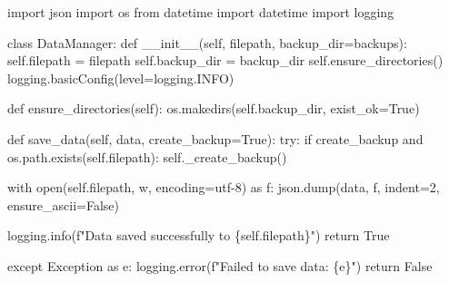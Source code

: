 \documentclass[
  letterpaper,
  DIV=11,
  numbers=noendperiod,
  oneside]{scrreprt}
\newenvironment{Shaded}{}{}
\newcommand{\BuiltInTok}[1]{\textcolor[rgb]{0.84,0.23,0.29}{#1}}
\newcommand{\ControlFlowTok}[1]{\textcolor[rgb]{0.84,0.23,0.29}{#1}}
\newcommand{\DecValTok}[1]{\textcolor[rgb]{0.00,0.36,0.77}{#1}}
\newcommand{\FunctionTok}[1]{\textcolor[rgb]{0.44,0.26,0.76}{#1}}
\newcommand{\ImportTok}[1]{\textcolor[rgb]{0.01,0.18,0.38}{#1}}
\newcommand{\KeywordTok}[1]{\textcolor[rgb]{0.84,0.23,0.29}{#1}}
\newcommand{\NormalTok}[1]{\textcolor[rgb]{0.14,0.16,0.18}{#1}}
\newcommand{\OperatorTok}[1]{\textcolor[rgb]{0.14,0.16,0.18}{#1}}
\newcommand{\PreprocessorTok}[1]{\textcolor[rgb]{0.84,0.23,0.29}{#1}}
\newcommand{\SpecialCharTok}[1]{\textcolor[rgb]{0.00,0.36,0.77}{#1}}
\newcommand{\SpecialStringTok}[1]{\textcolor[rgb]{0.01,0.18,0.38}{#1}}
\newcommand{\StringTok}[1]{\textcolor[rgb]{0.01,0.18,0.38}{#1}}
\newcommand{\VariableTok}[1]{\textcolor[rgb]{0.89,0.38,0.04}{#1}}
\begin{document}
\begin{Shaded}
\begin{Highlighting}[]
\ImportTok{import}\NormalTok{ json}
\ImportTok{import}\NormalTok{ os}
\ImportTok{from}\NormalTok{ datetime }\ImportTok{import}\NormalTok{ datetime}
\ImportTok{import}\NormalTok{ logging}

\KeywordTok{class}\NormalTok{ DataManager:}
    \KeywordTok{def} \FunctionTok{\_\_init\_\_}\NormalTok{(}\VariableTok{self}\NormalTok{, filepath, backup\_dir}\OperatorTok{=}\StringTok{\textquotesingle{}backups\textquotesingle{}}\NormalTok{):}
        \VariableTok{self}\NormalTok{.filepath }\OperatorTok{=}\NormalTok{ filepath}
        \VariableTok{self}\NormalTok{.backup\_dir }\OperatorTok{=}\NormalTok{ backup\_dir}
        \VariableTok{self}\NormalTok{.ensure\_directories()}
\NormalTok{        logging.basicConfig(level}\OperatorTok{=}\NormalTok{logging.INFO)}
        
    \KeywordTok{def}\NormalTok{ ensure\_directories(}\VariableTok{self}\NormalTok{):}
\NormalTok{        os.makedirs(}\VariableTok{self}\NormalTok{.backup\_dir, exist\_ok}\OperatorTok{=}\VariableTok{True}\NormalTok{)}
        
    \KeywordTok{def}\NormalTok{ save\_data(}\VariableTok{self}\NormalTok{, data, create\_backup}\OperatorTok{=}\VariableTok{True}\NormalTok{):}
        \ControlFlowTok{try}\NormalTok{:}
            \ControlFlowTok{if}\NormalTok{ create\_backup }\KeywordTok{and}\NormalTok{ os.path.exists(}\VariableTok{self}\NormalTok{.filepath):}
                \VariableTok{self}\NormalTok{.\_create\_backup()}
                
            \ControlFlowTok{with} \BuiltInTok{open}\NormalTok{(}\VariableTok{self}\NormalTok{.filepath, }\StringTok{\textquotesingle{}w\textquotesingle{}}\NormalTok{, encoding}\OperatorTok{=}\StringTok{\textquotesingle{}utf{-}8\textquotesingle{}}\NormalTok{) }\ImportTok{as}\NormalTok{ f:}
\NormalTok{                json.dump(data, f, indent}\OperatorTok{=}\DecValTok{2}\NormalTok{, ensure\_ascii}\OperatorTok{=}\VariableTok{False}\NormalTok{)}
                
\NormalTok{            logging.info(}\SpecialStringTok{f"Data saved successfully to }\SpecialCharTok{\{}\VariableTok{self}\SpecialCharTok{.}\NormalTok{filepath}\SpecialCharTok{\}}\SpecialStringTok{"}\NormalTok{)}
            \ControlFlowTok{return} \VariableTok{True}
            
        \ControlFlowTok{except} \PreprocessorTok{Exception} \ImportTok{as}\NormalTok{ e:}
\NormalTok{            logging.error(}\SpecialStringTok{f"Failed to save data: }\SpecialCharTok{\{}\NormalTok{e}\SpecialCharTok{\}}\SpecialStringTok{"}\NormalTok{)}
            \ControlFlowTok{return} \VariableTok{False}
            

\end{Highlighting}
\end{Shaded}
\end{document}
